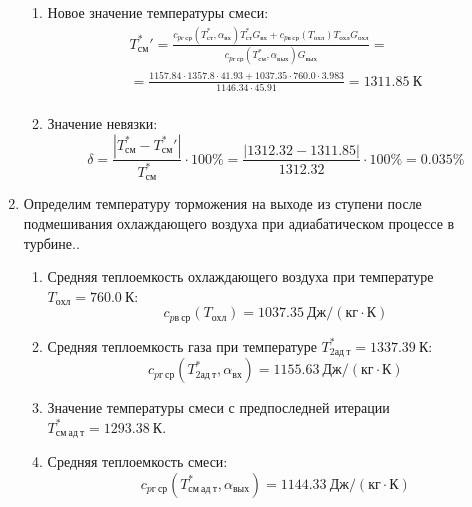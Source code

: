 \documentclass[a4paper,12pt]{article}
\begin{document}
\begin{enumerate}
\begin{enumerate}
            \item Новое значение температуры смеси:
            \begin{gather*}
                T_{см}^*\prime = \frac{
                        c_{pг\ ср} (T_{ст}^*, \alpha_{вх}) T_{ст}^* G_{вх} + c_{pв\ ср} (T_{охл}) T_{охл} G_{охл}
                    }{
                        c_{pг\ ср} (T_{см}^{*}, \alpha_{вых}) G_{вых}
                    } =\\
                = \frac{
                    1157.84
                    \cdot 1357.8 \cdot 41.93 +
                    1037.35
                    \cdot 760.0 \cdot 3.983
                }{
                    1146.34
                    \cdot  45.91
                } =
                1311.85\ К\\
            \end{gather*}

            \item Значение невязки:
            \[
                \delta = \frac{ \left| T_{см}^{*} - T_{см}^*\prime \right| }{T_{см}^{*}} \cdot 100 \% =
                    \frac{
                        \left| 1312.32 - 1311.85 \right|
                    }{
                        1312.32
                    } \cdot 100 \% =
                0.035 \%
            \]
        \end{enumerate}


        \item Определим температуру торможения на выходе из ступени после подмешивания охлаждающего воздуха при адиабатическом процессе в турбине..
        \begin{enumerate}

            \item Средняя теплоемкость охлаждающего воздуха при температуре $T_{охл} = 760.0\ К $:
            \[
                c_{pв\ ср} (T_{охл}) = 1037.35\ Дж/ (кг \cdot К)
            \]

            \item Средняя теплоемкость газа при температуре $T_{2ад\ т}^* = 1337.39 \ К $:
            \[
                c_{pг\ ср} (T_{2ад\ т}^*, \alpha_{вх}) =
                1155.63\ Дж/ (кг \cdot К)
            \]

            \item Значение температуры смеси с предпоследней итерации $T_{см\ ад\ т}^{*} = 1293.38\ К$.

            \item Средняя теплоемкость смеси:
            \[
                c_{pг\ ср} (T_{см\ ад\ т}^{*}, \alpha_{вых}) =
                1144.33\ Дж/ (кг \cdot К)
            \]


\end{enumerate}
\end{enumerate}
\end{document}
